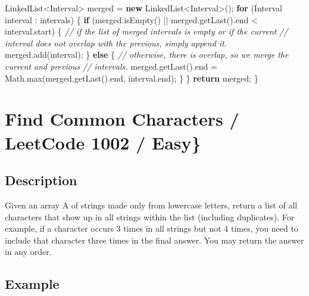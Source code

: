 \documentclass[]{book}
\newenvironment{Shaded}{\begin{snugshade}}{\end{snugshade}}
\newcommand{\BuiltInTok}[1]{#1}
\newcommand{\CommentTok}[1]{\textcolor[rgb]{0.56,0.35,0.01}{\textit{#1}}}
\newcommand{\FunctionTok}[1]{\textcolor[rgb]{0.00,0.00,0.00}{#1}}
\newcommand{\KeywordTok}[1]{\textcolor[rgb]{0.13,0.29,0.53}{\textbf{#1}}}
\newcommand{\NormalTok}[1]{#1}
\begin{document}
\begin{Shaded}
\begin{Highlighting}[]
    \BuiltInTok{LinkedList}\NormalTok{<Interval> merged = }\KeywordTok{new} \BuiltInTok{LinkedList}\NormalTok{<Interval>();}
    \KeywordTok{for}\NormalTok{ (Interval interval : intervals) \{}
        \KeywordTok{if}\NormalTok{ (merged.}\FunctionTok{isEmpty}\NormalTok{() || merged.}\FunctionTok{getLast}\NormalTok{().}\FunctionTok{end}\NormalTok{ < interval.}\FunctionTok{start}\NormalTok{) \{}
            \CommentTok{// if the list of merged intervals is empty or if the current}
            \CommentTok{// interval does not overlap with the previous, simply append it.}
\NormalTok{            merged.}\FunctionTok{add}\NormalTok{(interval);}
\NormalTok{        \} }\KeywordTok{else}\NormalTok{ \{}
            \CommentTok{// otherwise, there is overlap, so we merge the current and previous}
            \CommentTok{// intervals.}
\NormalTok{            merged.}\FunctionTok{getLast}\NormalTok{().}\FunctionTok{end}\NormalTok{ = }\BuiltInTok{Math}\NormalTok{.}\FunctionTok{max}\NormalTok{(merged.}\FunctionTok{getLast}\NormalTok{().}\FunctionTok{end}\NormalTok{, interval.}\FunctionTok{end}\NormalTok{);}
\NormalTok{        \}}
\NormalTok{    \}}
    \KeywordTok{return}\NormalTok{ merged;}
\NormalTok{\}}
\end{Highlighting}
\end{Shaded}

\hypertarget{find-common-characters-leetcode-1002-easy}{%
\section{Find Common Characters / LeetCode 1002 / Easy\}}\label{find-common-characters-leetcode-1002-easy}}

\hypertarget{description-22}{%
\subsection{Description}\label{description-22}}

Given an array A of strings made only from lowercase letters, return a list of all characters that show up in all
strings within the list (including duplicates). For example, if a character occurs 3 times in all strings but
not 4 times, you need to include that character three times in the final answer. You may return the answer in
any order.

\hypertarget{example-21}{%
\subsection{Example}\label{example-21}}
\end{document}
